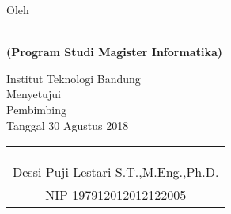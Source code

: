 \clearpage
\pagestyle{empty}

\begin{center}
\smallskip

    \singlespacing
    \large \bfseries \MakeUppercase{\thetitle}
    \vfill

    \normalsize \normalfont Oleh

    \bfseries \large \theauthor\\
    \normalsize (Program Studi Magister Informatika)

    \normalsize \normalfont Institut Teknologi Bandung \\

    \vfill
    \normalsize \normalfont
    Menyetujui\\
    Pembimbing\\
    \bigskip
    Tanggal 30 Agustus 2018

    \setlength{\tabcolsep}{12pt}
    \begin{tabular}{c}
        \\
        \\
        \\
        \\
        Dessi Puji Lestari S.T.,M.Eng.,Ph.D. \\
        NIP 197912012012122005 \\
    \end{tabular}

\end{center}
\clearpage
